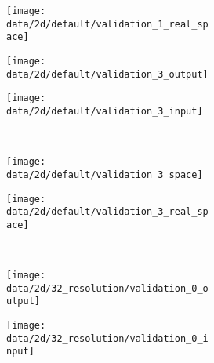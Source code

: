 \begin{figure}
\begin{subfigure}[t]{0.25\textwidth}
    \begin{subfigure}[t]{0.49\textwidth}
      \texttt{[image: data/2d/default/validation\_1\_real\_space]}
    \end{subfigure}
  \end{subfigure}
  \begin{subfigure}[t]{0.25\textwidth}
    \begin{subfigure}[t]{0.49\textwidth}
      \texttt{[image: data/2d/default/validation\_3\_output]}
    \end{subfigure}\hfill
    \begin{subfigure}[t]{0.49\textwidth}
      \texttt{[image: data/2d/default/validation\_3\_input]}
    \end{subfigure}\\[-2px]
    \begin{subfigure}[t]{0.49\textwidth}
      \texttt{[image: data/2d/default/validation\_3\_space]}
    \end{subfigure}\hfill
    \begin{subfigure}[t]{0.49\textwidth}
      \texttt{[image: data/2d/default/validation\_3\_real\_space]}
    \end{subfigure}
  \end{subfigure}\\
  \begin{subfigure}[]{0.125\textwidth}
    \vfill
    \vfill
  \end{subfigure}
  \begin{subfigure}[t]{0.25\textwidth}
    \begin{subfigure}[t]{0.49\textwidth}
      \texttt{[image: data/2d/32\_resolution/validation\_0\_output]}
    \end{subfigure}\hfill
    \begin{subfigure}[t]{0.49\textwidth}
      \texttt{[image: data/2d/32\_resolution/validation\_0\_input]}
    \end{subfigure}\\[-2px]

\end{subfigure}
\end{figure}
